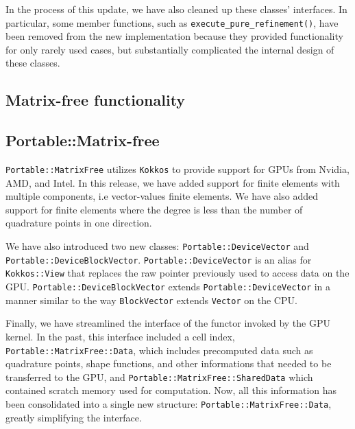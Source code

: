 \documentclass{ansarticle-preprint}
\newcommand{\specialword}[1]{\texttt{#1}}
\newcommand{\kokkos}{{\specialword{Kokkos}}\xspace}
\begin{document}
In the process of this update, we have also cleaned up these classes'
interfaces. In particular, some member functions, such as
\texttt{execute\_pure\_refinement()}, have been removed from the new
implementation because they provided functionality for only rarely
used cases, but substantially complicated the internal design of these
classes.


\subsection{Matrix-free functionality}


\subsection{Portable::Matrix-free}
\texttt{Portable::MatrixFree} utilizes \kokkos to provide support for GPUs from
Nvidia, AMD, and Intel. In this release, we have added support for finite
elements with multiple components, i.e vector-values finite elements. We have
also added support for finite elements where the degree is less than the number
of quadrature points in one direction.

We have also introduced two new classes: \texttt{Portable::DeviceVector} and
\texttt{Portable::DeviceBlockVector}. \texttt{Portable::DeviceVector} is an
alias for \texttt{Kokkos::View} that replaces the raw pointer previously used to
access data on the GPU. \texttt{Portable::DeviceBlockVector} extends
\texttt{Portable::DeviceVector} in a manner similar to the way
\texttt{BlockVector} extends \texttt{Vector} on the CPU.

Finally, we have streamlined the interface of the functor invoked by the GPU
kernel. In the past, this interface included a cell index,
\texttt{Portable::MatrixFree::Data}, which includes precomputed data such as
quadrature points, shape functions, and other informations that needed to be
transferred to the GPU, and \texttt{Portable::MatrixFree::SharedData} which
contained scratch memory used for computation. Now, all this information has
been consolidated into a single new structure:
\texttt{Portable::MatrixFree::Data}, greatly simplifying the interface.

\end{document}
